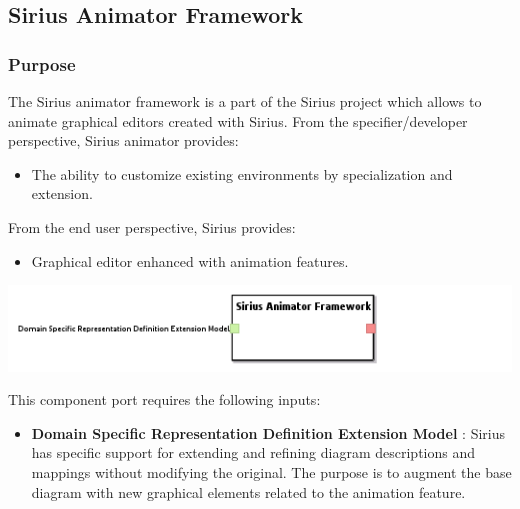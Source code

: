\documentclass{gemoc} %
\begin{document}
\subsection{Sirius Animator Framework}


\subsubsection{Purpose}
The Sirius animator framework is a part of the Sirius project which allows to animate graphical editors created with Sirius.
From the specifier/developer perspective, Sirius animator provides:
\begin{itemize}
\item The ability to customize existing environments by specialization and extension.
\end{itemize}
From the end user perspective, Sirius provides:
\begin{itemize}
\item Graphical editor enhanced with animation features.
\end{itemize}

\begin{center}
\includegraphics*[trim=0.0cm 0.0cm 0cm 0.0cm, clip=true]{../images/generated/Generated_Sirius_Animator_Framework.png}
\end{center}

This component port requires the following inputs:
\begin{itemize}
  \item \textbf{Domain Specific Representation Definition Extension Model} :
Sirius has specific support for extending and refining diagram descriptions and mappings without modifying the original. The purpose is to augment the base diagram with new graphical elements related to the animation feature.
\end{itemize}
\end{document}
